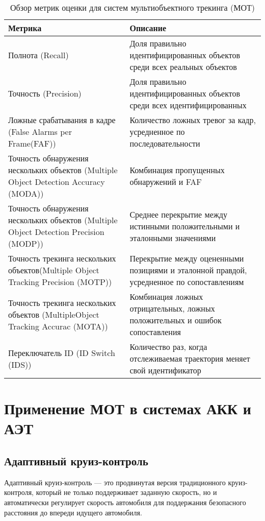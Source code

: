 \begin{table}[H]
	\centering
	\caption{Обзор метрик оценки для систем мультиобъектного трекинга (МОТ)}
	\label{metrics}
	\begin{tabularx}{\textwidth}{|X|X|}
		\hline
		Метрика & Описание\\ 
		\hline
		Полнота (Recall) & Доля правильно идентифицированных объектов среди всех реальных объектов \\
		\hline
		Точность (Precision) & Доля правильно идентифицированных объектов среди всех идентифицированных\\
		\hline
		Ложные срабатывания в кадре (False Alarms per Frame(FAF)) & Количество ложных тревог за кадр, усредненное по последовательности \\
		\hline
		Точность обнаружения нескольких объектов (Multiple Object Detection Accuracy (MODA)) & Комбинация пропущенных обнаружений и FAF \\
		\hline
		Точность обнаружения нескольких объектов (Multiple Object Detection Precision (MODP)) & Среднее перекрытие между истинными положительными и эталонными значениями \\
		\hline
		Точность трекинга нескольких объектов(Multiple Object Tracking Precision (MOTP)) & 
		Перекрытие между оцененными позициями и эталонной правдой, усредненное по сопоставлениям  \\ 
		\hline
		Точность трекинга нескольких объектов (MultipleObject Tracking Accurac (MOTA)) & Комбинация ложных отрицательных, ложных положительных и ошибок сопоставления \\
		\hline
		Переключатель ID (ID Switch (IDS)) & Количество раз, когда отслеживаемая траектория меняет свой идентификатор \\
		\hline
	\end{tabularx}
\end{table}


\chapter{Применение МОТ в системах АКК и АЭТ}

\section{Адаптивный круиз-контроль}
Адаптивный круиз-контроль --- это продвинутая версия традиционного круиз-контроля, который не только поддерживает заданную скорость, но и автоматически регулирует скорость автомобиля для поддержания безопасного расстояния до впереди идущего автомобиля.

